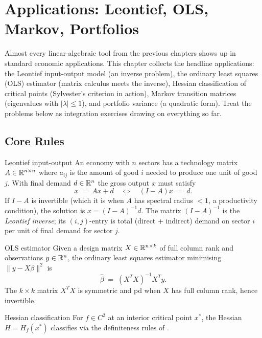 \chapter{Applications: Leontief, OLS, Markov, Portfolios}

Almost every linear-algebraic tool from the previous chapters shows up in
standard economic applications. This chapter collects the headline applications:
the Leontief input-output model (an inverse problem), the ordinary least
squares (OLS) estimator (matrix calculus meets the inverse), Hessian
classification of critical points (Sylvester's criterion in action), Markov
transition matrices (eigenvalues with $|\lambda| \le 1$), and portfolio
variance (a quadratic form). Treat the problems below as integration
exercises drawing on everything so far.

\section{Core Rules}

\begin{rulebox}{Leontief input-output}
An economy with $n$ sectors has a technology matrix $A \in \mathbb{R}^{n \times n}$
where $a_{ij}$ is the amount of good $i$ needed to produce one unit of good
$j$. With final demand $d \in \mathbb{R}^{n}$ the gross output $x$ must satisfy
\[
x \;=\; A x + d \quad \Longleftrightarrow \quad (I - A) x \;=\; d.
\]
If $I - A$ is invertible (which it is when $A$ has spectral radius $< 1$, a
productivity condition), the solution is $x = (I - A)^{-1} d$. The matrix
$(I - A)^{-1}$ is the \emph{Leontief inverse}; its $(i, j)$-entry is total
(direct $+$ indirect) demand on sector $i$ per unit of final demand for
sector $j$.
\end{rulebox}

\begin{rulebox}{OLS estimator}
Given a design matrix $X \in \mathbb{R}^{n \times k}$ of full column rank and
observations $y \in \mathbb{R}^{n}$, the ordinary least squares estimator minimising
$\|y - X \beta\|^{2}$ is
\[
\hat{\beta} \;=\; (X^{T} X)^{-1} X^{T} y.
\]
The $k \times k$ matrix $X^{T} X$ is symmetric and pd when $X$ has full
column rank, hence invertible.
\end{rulebox}

\begin{rulebox}{Hessian classification}
For $f \in C^{2}$ at an interior critical point $x^{*}$, the Hessian
$H = H_{f}(x^{*})$ classifies via the definiteness rules of .
\end{rulebox}

